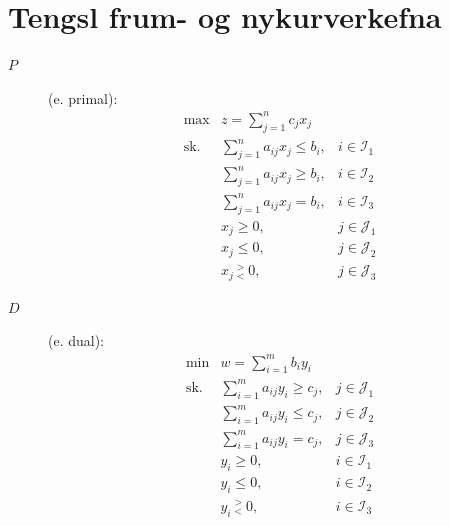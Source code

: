 \section{Tengsl frum- og nykurverkefna}
\begin{description}
 \item[ $P$] (e. primal):
\begin{eqnarray*}
\max & z = \sum_{j=1}^n c_j x_j & \\
\mbox{sk.} & \sum_{j=1}^n a_{ij}x_j \le b_i, & i \in \mathcal{I}_1\\
 & \sum_{j=1}^n a_{ij}x_j \ge b_i, & i \in \mathcal{I}_2\\
 & \sum_{j=1}^n a_{ij}x_j = b_i, & i \in \mathcal{I}_3 \\
 & x_j \ge 0, & j \in \mathcal{J}_1  \\
 & x_j \le 0, & j \in \mathcal{J}_2  \\
 & x_j \ ^>_<\  0, & j \in \mathcal{J}_3  
\end{eqnarray*}
 \item[ $D$] (e. dual):
\begin{eqnarray*}
\min & w = \sum_{i=1}^m b_i y_i & \\
\mbox{sk.} & \sum_{i=1}^m a_{ij}y_i \ge c_j, & j \in \mathcal{J}_1\\
 & \sum_{i=1}^m a_{ij}y_i \le c_j, & j \in \mathcal{J}_2\\
 & \sum_{i=1}^m a_{ij}y_i = c_j, & j \in \mathcal{J}_3 \\
 & y_i \ge 0, & i\in \mathcal{I}_1  \\
 & y_i \le 0, & i\in \mathcal{I}_2  \\
 & y_i \ ^>_<\  0, & i \in \mathcal{I}_3  
\end{eqnarray*}
\end{description}

